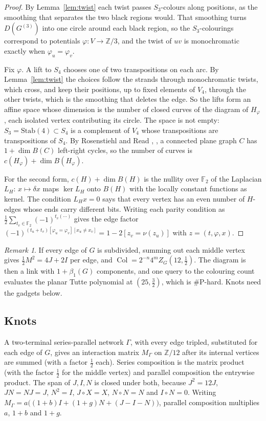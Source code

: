\documentclass[11pt]{article}
\theoremstyle{definition}
\theoremstyle{remark}
\newtheorem{remark}[theorem]{Remark}
\newcommand{\F}{\mathbb{F}}
\newcommand{\Z}{\mathbb{Z}}
\newcommand{\Col}{\operatorname{Col}}
\newcommand{\sharpP}{\#\mathrm{P}}
\begin{document}
\begin{proof}
By Lemma~\ref{lem:twist} each twist passes $S_3$-colours along positions, as
the smoothing that separates the two black regions would. That smoothing
turns $D(G^{(3)})$ into one circle around each black region, so the
$S_3$-colourings correspond to potentials $\varphi\colon V\to\Z/3$, and the
twist of $uv$ is monochromatic exactly when $\varphi_u=\varphi_v$.

Fix $\varphi$. A lift to $S_4$ chooses one of two transpositions on each arc.
By Lemma~\ref{lem:twist} the choices follow the strands through monochromatic
twists, which cross, and keep their positions, up to fixed elements of $V_4$,
through the other twists, which is the smoothing that deletes the edge. So the
lifts form an affine space whose dimension is the number of closed curves of
the diagram of $H_\varphi$, each isolated vertex contributing its circle. The
space is not empty: $S_3=\mathrm{Stab}(4)\subset S_4$ is a complement of $V_4$
whose transpositions are transpositions of $S_4$. By Rosenstiehl and Read
\cite{RR78}, \cite[\S17.3]{GR01}, a connected plane graph $C$ has
$1+\dim B(C)$ left-right cycles, so the number of curves is
$c(H_\varphi)+\dim B(H_\varphi)$.

For the second form, $c(H)+\dim B(H)$ is the nullity over $\F_2$ of the
Laplacian $L_H$: $x\mapsto\delta x$ maps $\ker L_H$ onto $B(H)$ with the
locally constant functions as kernel. The condition $L_Hx=0$ says that every
vertex has an even number of $H$-edges whose ends carry different bits.
Writing each parity condition as $\tfrac12\sum_{t_v\in\F_2}(-1)^{t_v(\cdots)}$
gives the edge factor $(-1)^{(t_u+t_v)[\varphi_u=\varphi_v][x_u\ne x_v]}
=1-2[z_v=\nu(z_u)]$ with $z=(t,\varphi,x)$.
\end{proof}

\begin{remark}\label{rem:links}
If every edge of $G$ is subdivided, summing out each middle vertex gives
$\tfrac12M^2=4J+2I$ per edge, and
$\Col=2^{-n}4^mZ_G(12,\tfrac12)$. The diagram is then a link with
$1+\beta_1(G)$ components, and one query to the colouring count evaluates the
planar Tutte polynomial at $(25,\tfrac32)$, which is $\sharpP$-hard. Knots need
the gadgets below.
\end{remark}

\subsection{Knots}

A two-terminal series-parallel network $\Gamma$, with every edge tripled,
substituted for each edge of $G$, gives an interaction matrix $M_\Gamma$ on
$\Z/12$ after its internal vertices are summed (with a factor $\tfrac12$ each).
Series composition is the matrix product (with the factor $\tfrac12$ for the
middle vertex) and parallel composition the entrywise product. The span of $J,I,N$ is closed under both, because $J^2=12J$,
$JN=NJ=J$, $N^2=I$, $J\circ X=X$, $N\circ N=N$ and $I\circ N=0$. Writing
$M_\Gamma=a\bigl((1+b)I+(1+g)N+(J-I-N)\bigr)$, parallel composition multiplies
$a$, $1+b$ and $1+g$.
\end{document}
